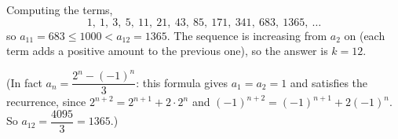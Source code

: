 Computing the terms,
\[1,\ 1,\ 3,\ 5,\ 11,\ 21,\ 43,\ 85,\ 171,\ 341,\ 683,\ 1365,\ \dots\]
so $a_{11}=683\le1000<a_{12}=1365$. The sequence is increasing from $a_2$ on (each term adds a positive amount to the previous one), so the answer is $k=\boxed{12}$.

(In fact $a_n=\dfrac{2^n-(-1)^n}{3}$: this formula gives $a_1=a_2=1$ and satisfies the recurrence, since $2^{n+2}=2^{n+1}+2\cdot2^n$ and $(-1)^{n+2}=(-1)^{n+1}+2(-1)^n$. So $a_{12}=\dfrac{4095}{3}=1365$.)
